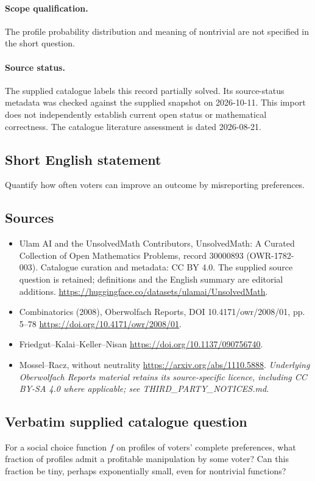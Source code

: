 \documentclass[11pt]{article}
\begin{document}
\paragraph{Scope qualification.}
The profile probability distribution and meaning of nontrivial are not specified in the short question.
\paragraph{Source status.}
The supplied catalogue labels this record partially solved. Its source-status metadata was checked against the supplied snapshot on 2026-10-11. This import does not independently establish current open status or mathematical correctness. The catalogue literature assessment is dated 2026-08-21.
\subsection{Short English statement}
Quantify how often voters can improve an outcome by misreporting preferences.
\subsection{Sources}
\begin{itemize}
\item[S1] Ulam AI and the UnsolvedMath Contributors, UnsolvedMath: A Curated Collection of Open Mathematics Problems, record 30000893 (OWR-1782-003). Catalogue curation and metadata: CC BY 4.0. The supplied source question is retained; definitions and the English summary are editorial additions.
\url{https://huggingface.co/datasets/ulamai/UnsolvedMath}.
\item[S2] Combinatorics (2008), Oberwolfach Reports, DOI 10.4171/owr/2008/01, pp. 5--78
\url{https://doi.org/10.4171/owr/2008/01}.
\item[S3] Friedgut--Kalai--Keller--Nisan
\url{https://doi.org/10.1137/090756740}.
\item[S4] Mossel--Racz, without neutrality
\url{https://arxiv.org/abs/1110.5888}.
\textit{Underlying Oberwolfach Reports material retains its source-specific licence, including CC BY-SA 4.0 where applicable; see THIRD\_PARTY\_NOTICES.md.}
\end{itemize}
\subsection{Verbatim supplied catalogue question}
For a social choice function $f$ on profiles of voters' complete preferences, what fraction of profiles admit a profitable manipulation by some voter? Can this fraction be tiny, perhaps exponentially small, even for nontrivial functions?
\end{document}
